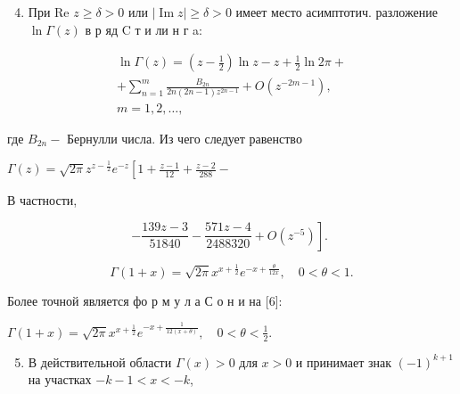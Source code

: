 \documentclass[10pt]{article}
\begin{document}
\begin{enumerate}

  \setcounter{enumi}{3}

  \item При Re $z \geqslant \delta>0$ или $|\operatorname{Im} z| \geqslant \delta>0$ имеет место асимптотич. разложение $\ln \Gamma(z)$ в р яд $\mathrm{C}$ т и ли н г a:

\end{enumerate}



\[

\begin{gathered}

\ln \Gamma(z)=\left(z-\frac{1}{2}\right) \ln z-z+\frac{1}{2} \ln 2 \pi+ \\

+\sum_{n=1}^{m} \frac{B_{2 n}}{2 n(2 n-1) z^{2 n-1}}+O\left(z^{-2 m-1}\right), \\

m=1,2, \ldots,

\end{gathered}

\]



где $B_{2 n}-$ Бернулли числа. Из чего следует равенство



$\Gamma(z)=\sqrt{2 \pi} z^{z-\frac{1}{2}} e^{-z}\left[1+\frac{z-1}{12}+\frac{z-2}{288}-\right.$



В частности,



\[

\left.-\frac{139 z-3}{51840}-\frac{571 z-4}{2488320}+O\left(z^{-5}\right)\right] \text {. }

\]



\[

\Gamma(1+x)=\sqrt{2 \pi} x^{x+\frac{1}{2}} e^{-x+\frac{\theta}{12 x}}, \quad 0<\theta<1 .

\]



Более точной является фо р м у л а С о н и на [6]:



$\Gamma(1+x)=\sqrt{2 \pi} x^{x+\frac{1}{2}} e^{-x+\frac{1}{12(x+\theta)}}, \quad 0<\theta<\frac{1}{2}$.



\begin{enumerate}

  \setcounter{enumi}{4}

  \item В действительной области $\Gamma(x)>0$ для $x>0$ и принимает знак $(-1)^{k+1}$ на участках $-k-1<x<-k$,

\end{enumerate}
\end{document}
